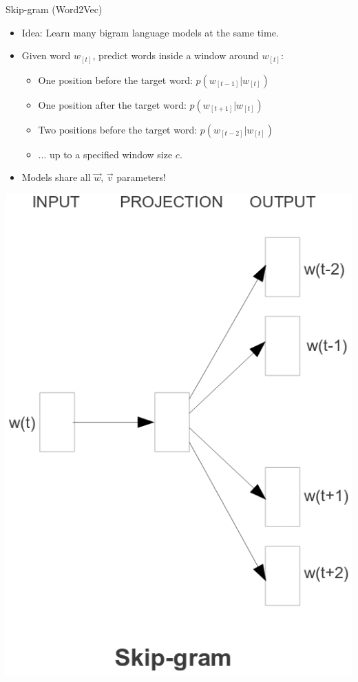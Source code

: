 \begin{vbframe}{Skip-gram (Word2Vec)}

\vfill

\begin{minipage}{.63\textwidth}
\begin{itemize}
	\item Idea: Learn many bigram language models at the same time.
	\item Given word $w_{[t]}$, predict words inside a window around $w_{[t]}$:
		\begin{itemize}
			 \item One position before the target word: $p(w_{[t-1]}|w_{[t]})$
			 \item One position after the target word: $p(w_{[t+1]}|w_{[t]})$
			 \item Two positions before the target word: $p(w_{[t-2]}|w_{[t]})$
			 \item ... up to a specified window size $c$.
		\end{itemize}
	\item Models share all $\vec w$, $\vec v$ parameters!
\end{itemize}
\end{minipage}
\begin{minipage}{.36\textwidth}
\begin{center}
\includegraphics[scale=0.99]{figure/skipgram}
\end{center}
\end{minipage}

\vfill

\end{vbframe}

